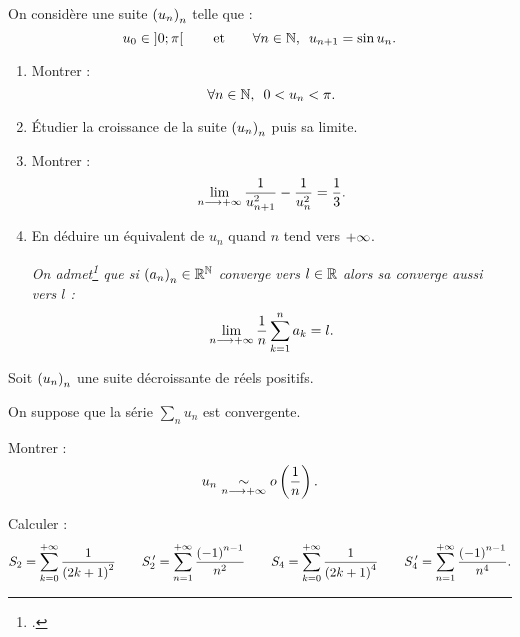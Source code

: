 \begin{exo}[Exercice 16]
On considère une suite \(\left(u_n\right)_n\) telle que : \[u_0\in\intervee{0}{\pi}\qquad\text{et}\qquad\quantifs{\forall n\in\N}u_{n+1}=\sin u_n.\]

\begin{enumerate}
\item Montrer : \[\quantifs{\forall n\in\N}0<u_n<\pi.\]

\item Étudier la croissance de la suite \(\left(u_n\right)_n\) puis sa limite. \\

\item Montrer : \[\lim_{n\longrightarrow+\infty}\dfrac{1}{u_{n+1}^2}-\dfrac{1}{u_n^2}=\dfrac{1}{3}.\]

\item En déduire un équivalent de \(u_n\) quand \(n\) tend vers \(+\infty\).

\textit{On admet\footnote{\Cf {}.} que si \(\left(a_n\right)_n\in\mathbb{R}^{\mathbb{N}}\) converge vers \(l\in\mathbb{R}\) alors sa  converge aussi vers \(l\) :} \[\lim_{n\longrightarrow+\infty}\dfrac{1}{n}\sum_{k=1}^na_k=l.\]
\end{enumerate}
\end{exo}

\begin{corr}
\end{corr}

\begin{exo}[Exercice 17]
Soit \(\left(u_n\right)_n\) une suite décroissante de réels positifs.

On suppose que la série \(\sum_nu_n\) est convergente.

Montrer : \[u_n\underset{n\longrightarrow+\infty}{\sim}o\left(\dfrac{1}{n}\right).\]
\end{exo}

\begin{corr}
\end{corr}

\begin{exo}
Calculer : \[S_2=\sum_{k=0}^{+\infty}\dfrac{1}{\left(2k+1\right)^2}\qquad S_2^{\,\prime}=\sum_{n=1}^{+\infty}\dfrac{\left(-1\right)^{n-1}}{n^2}\qquad S_4=\sum_{k=0}^{+\infty}\dfrac{1}{\left(2k+1\right)^4}\qquad S_4^{\,\prime}=\sum_{n=1}^{+\infty}\dfrac{\left(-1\right)^{n-1}}{n^4}.\]
\end{exo}

\begin{corr}
\end{corr}

